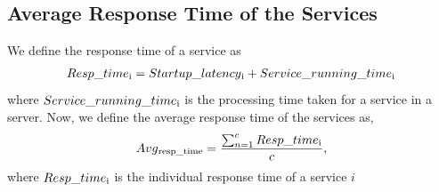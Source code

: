 \documentclass[conference]{IEEEtran}
\begin{document}
\subsection{Average Response Time of the Services}
We define the response time of a service as
\begin{align*} Resp\_time\textsubscript{i} = Startup\_latency\textsubscript{i}+
 Service\_running\_time\textsubscript{i}\end{align*}
where \begin{math} Service\_running\_time\textsubscript{i}\end{math}
is the processing time taken
for a service in a server. Now, we define the average response
time of the services as,
\begin{align*} Avg\textsubscript{resp\_time} =\frac {\sum_{n=1}^{c} Resp\_time\textsubscript{i}} {c} ,\end{align*}
where \begin{math} Resp\_time\textsubscript{i}\end{math} is the individual response time of a service \begin{math} i \end{math}
\end{document}
